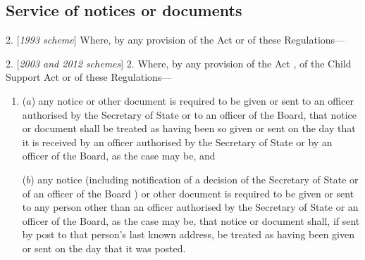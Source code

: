 \documentclass[12pt,a4paper]{article}
\begin{document}
\subsection[2. Service of notices or documents]{Service of notices or documents}

2.  [\emph{1993 scheme}] Where, by any provision of the Act or of these Regulations—

2.  [\emph{2003 and 2012 schemes}] 2.  Where, by any provision of the Act%
, of the Child Support Act
or of these Regulations—

\begin{enumerate}\item[]
($a$) any notice or other document is required to be given or sent 
to an officer authorised by the Secretary of State
or to an officer of the Board,  %
that notice or document shall be treated as having been so given or sent on the day that it is received 
by an officer authorised by the Secretary of State
or by an officer of the Board,  %
as the case may be, and

($b$) any notice (including notification of a decision of the Secretary of State
or of an officer of the Board%
) or other document is required to be given or sent to any person other than 
an officer  %
authorised by the Secretary of State
or an officer of the Board,  %
as the case may be, that notice or document shall, if sent by post to that person’s last known address, be treated as having been given or sent on the day that it was posted.\end{enumerate}

\end{document}
